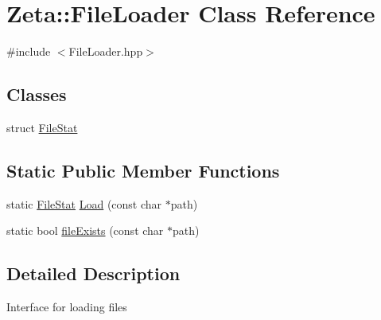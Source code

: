 \hypertarget{classZeta_1_1FileLoader}{\section{Zeta\+:\+:File\+Loader Class Reference}
\label{classZeta_1_1FileLoader}
}


{\ttfamily \#include $<$File\+Loader.\+hpp$>$}

\subsection*{Classes}
\begin{DoxyCompactItemize}
\item 
struct \hyperlink{structZeta_1_1FileLoader_1_1FileStat}{File\+Stat}
\end{DoxyCompactItemize}
\subsection*{Static Public Member Functions}
\begin{DoxyCompactItemize}
\item 
static \hyperlink{structZeta_1_1FileLoader_1_1FileStat}{File\+Stat} \hyperlink{classZeta_1_1FileLoader_a6b0fb3a642afb9d316e75b88b00d45e0}{Load} (const char $\ast$path)
\item 
static bool \hyperlink{classZeta_1_1FileLoader_aad604fa6b1626be357d14d2e6795b026}{file\+Exists} (const char $\ast$path)
\end{DoxyCompactItemize}


\subsection{Detailed Description}
Interface for loading files 

